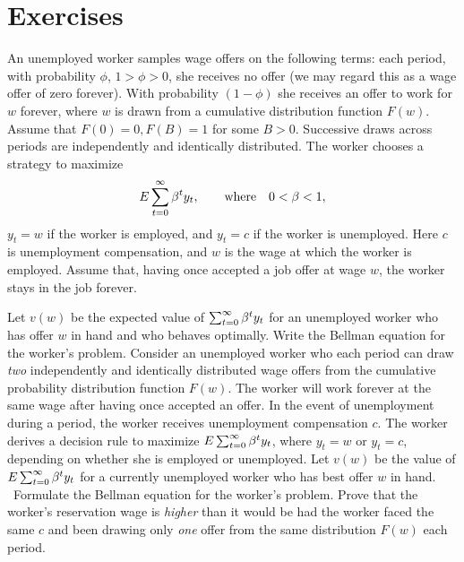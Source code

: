 \showchaptIDfalse
\showsectIDfalse
\section{Exercises}
\showchaptIDtrue
\showsectIDtrue
\medskip
{}
\medskip
\noindent An unemployed worker samples wage offers on the following terms:  each period,
with probability $\phi$, $1>\phi>0$, she receives no offer (we may regard this
as a wage offer of zero forever).  With probability $(1-\phi)$ she receives an
offer to work for $w$ forever, where $w$ is drawn from a cumulative
distribution function $F(w)$. Assume that $F(0) = 0, F(B) =1$ for some $B >0$.   Successive draws across periods are
independently and identically distributed.  The worker chooses a strategy to
maximize
$$E\sum_{t=0}^\infty {\beta}^t y_t,\qquad {\rm where}\quad 0<{\beta}<1,$$
$y_t=w$ if the worker is employed, and $y_t=c$ if the worker is unemployed.
Here $c$ is unemployment compensation, and $w$ is the wage at which the worker
is employed.  Assume that, having once accepted a job offer at wage $w$, the
worker stays in the job forever.

Let $v(w)$ be the expected value of $\sum_{t=0}^\infty{\beta}^t y_t$ for an
unemployed worker who has offer $w$ in hand and who behaves optimally.  Write
the Bellman equation for the worker's problem.
\medskip
{} 
\medskip
\noindent Consider an unemployed worker who each period can draw {\it two\/} independently
and identically distributed wage offers from the cumulative probability
distribution function $F(w)$.  The worker will work forever at the same wage
 after having once accepted an offer.  In the event of unemployment during a
period, the worker receives unemployment compensation $c$.  The
worker derives a decision rule to maximize $E\sum_{t=0}^\infty
{\beta}^t y_t$, where $y_t=w$ or $y_t=c$, depending on whether she is
employed or unemployed.  Let $v(w)$ be the value of $E
\sum_{t=0}^\infty {\beta}^t y_t$ for a currently unemployed worker who
has best offer $w$ in hand.
\medskip{}  \ Formulate the
Bellman equation for the worker's problem.
\medskip{}
 Prove that the worker's reservation wage is {\it higher\/} than it
would be had the worker faced the same $c$ and been drawing only {\it one\/}
offer from the same distribution $F(w)$ each period.


